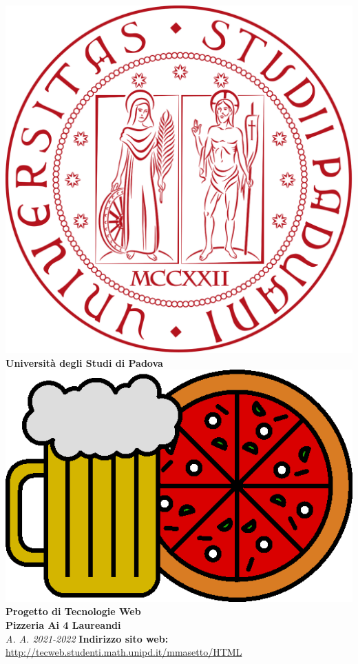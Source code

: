 \begin{center}
	\includegraphics[scale=0.05]{resources/logo_unipd.png}\\
	\bigskip
	\textbf{Università degli Studi di Padova}\\
	\vfill
	\includegraphics[scale=0.275]{resources/logo.png}
	\vfill
	\huge 
	\textbf{Progetto di Tecnologie Web\\Pizzeria Ai 4 Laureandi}\\
	\bigskip
	\large
	\textit{A. A. 2021-2022}
	\vfill
	\textbf{Indirizzo sito web:}  \url{http://tecweb.studenti.math.unipd.it/mmasetto/HTML}\\

\end{center}
